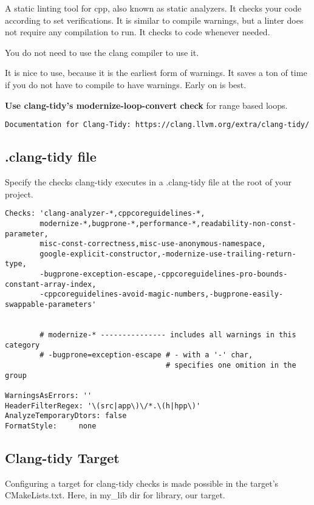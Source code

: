 A static linting tool for cpp, also known as static analyzers. It checks your code according
to set verifications. It is similar to compile warnings, but a linter does not require any compilation
to run. It checks to code whenever needed.


You do not need to use the clang compiler to use it.


It is nice to use, because it is the earliest form of warnings. It saves a ton of time if you do not have to compile
to have warnings. Early on is best.


\textbf{Use clang-tidy's modernize-loop-convert check} for range based loops.


\begin{verbatim}
Documentation for Clang-Tidy: https://clang.llvm.org/extra/clang-tidy/
\end{verbatim}


\subsection{.clang-tidy file}

Specify the checks clang-tidy executes in a .clang-tidy file at the root of your project.

\begin{verbatim}
Checks: 'clang-analyzer-*,cppcoreguidelines-*,
        modernize-*,bugprone-*,performance-*,readability-non-const-parameter,
        misc-const-correctness,misc-use-anonymous-namespace,
        google-explicit-constructor,-modernize-use-trailing-return-type,
        -bugprone-exception-escape,-cppcoreguidelines-pro-bounds-constant-array-index,
        -cppcoreguidelines-avoid-magic-numbers,-bugprone-easily-swappable-parameters'


        # modernize-* --------------- includes all warnings in this category
        # -bugprone=exception-escape # - with a '-' char, 
                                     # specifies one omition in the group

WarningsAsErrors: ''
HeaderFilterRegex: '\(src|app\)\/*.\(h|hpp\)'
AnalyzeTemporaryDtors: false
FormatStyle:     none
\end{verbatim}


\subsection{Clang-tidy Target}

Configuring a target for clang-tidy checks is made possible in the target's CMakeLists.txt. Here, in my\_lib dir
for library, our target.


